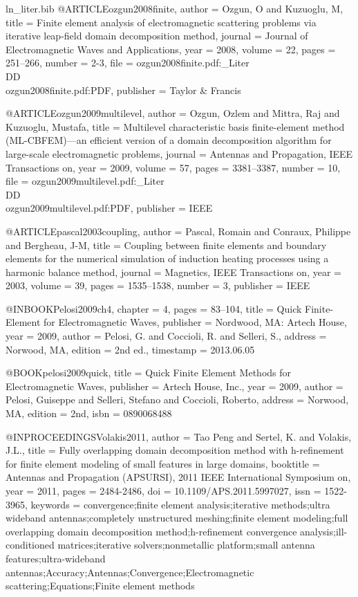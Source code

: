 \begin{filecontents*}{ln_liter.bib}
@ARTICLE{ozgun2008finite,
  author = {Ozgun, O and Kuzuoglu, M},
  title = {Finite element analysis of electromagnetic scattering problems via
	iterative leap-field domain decomposition method},
  journal = {Journal of Electromagnetic Waves and Applications},
  year = {2008},
  volume = {22},
  pages = {251--266},
  number = {2-3},
  file = {ozgun2008finite.pdf:_Liter\\DD\\ozgun2008finite.pdf:PDF},
  publisher = {Taylor \& Francis}
}

@ARTICLE{ozgun2009multilevel,
  author = {Ozgun, Ozlem and Mittra, Raj and Kuzuoglu, Mustafa},
  title = {Multilevel characteristic basis finite-element method ({ML-CBFEM})—an
	efficient version of a domain decomposition algorithm for large-scale
	electromagnetic problems},
  journal = {Antennas and Propagation, IEEE Transactions on},
  year = {2009},
  volume = {57},
  pages = {3381--3387},
  number = {10},
  file = {ozgun2009multilevel.pdf:_Liter\\DD\\ozgun2009multilevel.pdf:PDF},
  publisher = {IEEE}
}

@ARTICLE{pascal2003coupling,
  author = {Pascal, Romain and Conraux, Philippe and Bergheau, J-M},
  title = {Coupling between finite elements and boundary elements for the numerical
	simulation of induction heating processes using a harmonic balance
	method},
  journal = {Magnetics, IEEE Transactions on},
  year = {2003},
  volume = {39},
  pages = {1535--1538},
  number = {3},
  publisher = {IEEE}
}

@INBOOK{Pelosi2009ch4,
  chapter = {4},
  pages = {83--104},
  title = {Quick Finite-Element for Electromagnetic Waves},
  publisher = {Nordwood, MA: Artech House},
  year = {2009},
  author = {Pelosi, G. and Coccioli, R. and Selleri, S.},
  address = {Norwood, MA},
  edition = {2nd ed.},
  timestamp = {2013.06.05}
}

@BOOK{pelosi2009quick,
  title = {Quick Finite Element Methods for Electromagnetic Waves},
  publisher = {Artech House, Inc.},
  year = {2009},
  author = {Pelosi, Guiseppe and Selleri, Stefano and Coccioli, Roberto},
  address = {Norwood, MA},
  edition = {2nd},
  isbn = {0890068488}
}

@INPROCEEDINGS{Volakis2011,
  author = {Tao Peng and Sertel, K. and Volakis, J.L.},
  title = {Fully overlapping domain decomposition method with h-refinement for
	finite element modeling of small features in large domains},
  booktitle = {Antennas and Propagation (APSURSI), 2011 IEEE International Symposium
	on},
  year = {2011},
  pages = {2484-2486},
  doi = {10.1109/APS.2011.5997027},
  issn = {1522-3965},
  keywords = {convergence;finite element analysis;iterative methods;ultra wideband
	antennas;completely unstructured meshing;finite element modeling;full
	overlapping domain decomposition method;h-refinement convergence
	analysis;ill-conditioned matrices;iterative solvers;nonmetallic platform;small
	antenna features;ultra-wideband antennas;Accuracy;Antennas;Convergence;Electromagnetic
	scattering;Equations;Finite element methods}
}


\end{filecontents*}
